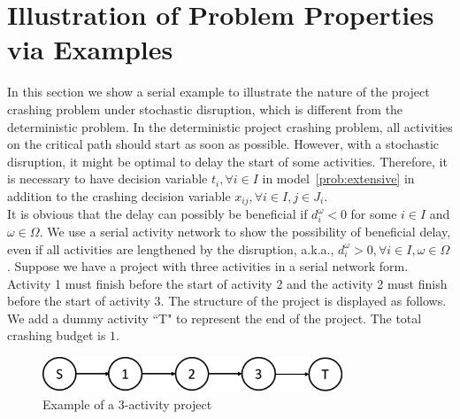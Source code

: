 \documentclass[11pt]{article}
\begin{document}
\section{Illustration of Problem Properties via Examples} \label{sec:examples}
	In this section we show a serial example to illustrate the nature of the project crashing problem under stochastic disruption, which is different from the deterministic problem. In the deterministic project crashing problem, all activities on the critical path should start as soon as possible. However, with a stochastic disruption, it might be optimal to delay the start of some activities. Therefore, it is necessary to have decision variable \(t_i, \forall i \in I\) in model~\eqref{prob:extensive} in addition to the crashing decision variable \(x_{ij}, \forall i \in I, j \in J_i\). \\
	\newline
	It is obvious that the delay can possibly be beneficial if \(d_i^\omega < 0\) for some \(i \in I\) and \(\omega \in \Omega\). We use a serial activity network to show the possibility of beneficial delay, even if all activities are lengthened by the disruption, a.k.a., \(d_i^\omega > 0, \forall i \in I, \omega \in \Omega\). Suppose we have a project with three activities in a serial network form. Activity 1 must finish before the start of activity 2 and the activity 2 must finish before the start of activity 3. The structure of the project is displayed as follows. We add a dummy activity ``T" to represent the end of the project. The total crashing budget is \(1\). 
	\begin{figure}[H]
		\centering
		\includegraphics[width=0.8\textwidth]{serial3}
		\caption{Example of a 3-activity project}
		\label{fig:serial3}
	\end{figure}
\end{document}
